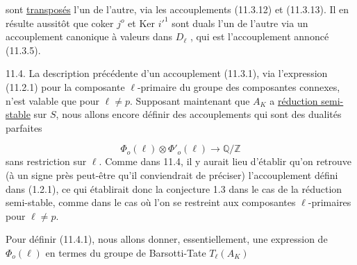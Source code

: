 \begin{center}
\end{center}
sont \underline{transposés} l'un de l'autre, via les accouplements (11.3.12) et (11.3.13). Il en résulte aussitôt que coker $j^o$ et Ker ${i'}^{1}$ sont duals l'un de l'autre via un accouplement canonique à valeurs dans $D_\ell$ , qui est l'accouplement annoncé (11.3.5).

11.4.  La description précédente d'un accouplement (11.3.1), via l'expression (11.2.1) pour la composante $\ell$-primaire du groupe des composantes connexes, n'est valable que pour $\ell \neq p$. Supposant maintenant que $A_K$ a \underline{réduction semi-stable} sur $S$, nous allons encore définir des accouplements qui sont des dualités parfaites

\begin{equation}\tag{11.4.1}
\Phi_o(\ell) \otimes \Phi'_o(\ell) \longrightarrow \mathbb{Q}/\mathbb{Z}
\end{equation}
sans restriction sur $\ell$. Comme dans 11.4, il y aurait lieu d'établir qu'on retrouve (à un signe près peut-être qu'il conviendrait de préciser) l'accouplement défini dans (1.2.1), ce qui établirait donc la conjecture 1.3 dans le cas de la réduction semi-stable, comme dans le cas où l'on se restreint aux composantes $\ell$-primaires pour $\ell \neq p$.

Pour définir (11.4.1), nous allons donner, essentiellement, une expression de $\Phi_o(\ell)$ en termes du groupe de Barsotti-Tate $T_\ell(A_K)$


